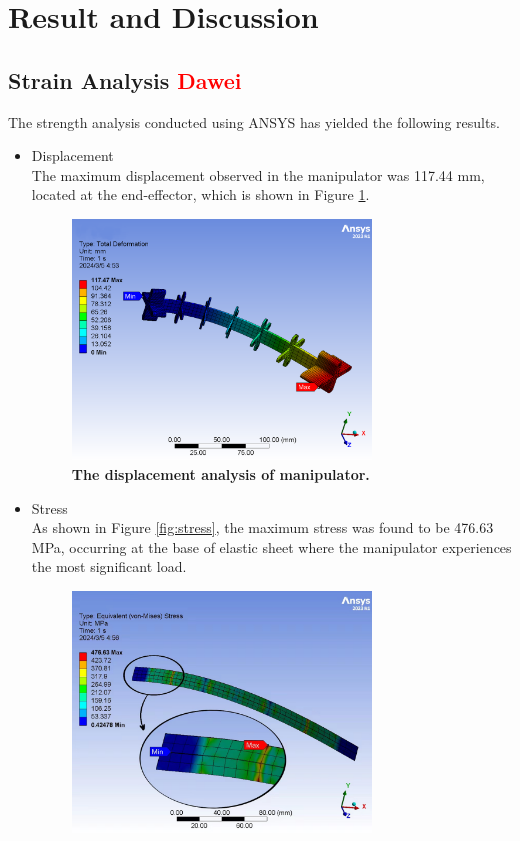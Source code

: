 \section{Result and Discussion} 
\subsection{Strain Analysis \textcolor{red}{Dawei}}
The strength analysis conducted using ANSYS has yielded the following results.
\begin{itemize}
    \item Displacement \\
    The maximum displacement observed in the manipulator was 117.44 mm, located at the end-effector, which is shown 
    in Figure \ref{fig:displacement}.
    \begin{figure}[H] %
        \centering 
        \captionsetup{labelsep=colon}
        \includegraphics[width=0.75\textwidth]{Image/Result/displacement.png} 
        \caption[The displacement analysis of manipulator]
        {\centering \textbf{The displacement analysis of manipulator.}}
        \label{fig:displacement}
    \end{figure}
    \item Stress \\
    As shown in Figure \ref{fig:stress}, the maximum stress was found to be 476.63 MPa, occurring at the base of 
    elastic sheet where the manipulator experiences the most significant load. 
    \begin{figure}[H] %
        \centering 
        \captionsetup{labelsep=colon}
        \includegraphics[width=0.75\textwidth]{Image/Result/stress.jpg} 

\end{figure}
\end{itemize}
